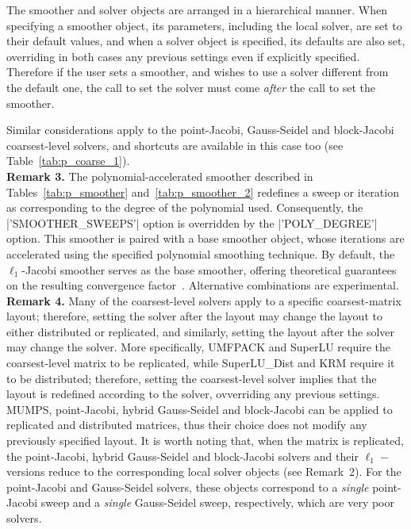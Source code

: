 The smoother and solver objects are arranged in a
hierarchical manner. When specifying a smoother object, its parameters,
including the local solver, are set to their default values, and when a solver
object is specified, its defaults are also set, overriding in both
cases any previous settings even if explicitly specified. Therefore if
the user sets a smoother, and wishes to use a solver
different from  the default one, the call to set the solver must come
\emph{after} the call to set the smoother.

Similar considerations apply to the point-Jacobi, Gauss-Seidel and block-Jacobi
coarsest-level solvers, and shortcuts are available
in this case too (see Table~\ref{tab:p_coarse_1}). \\

\textbf{Remark 3.} The polynomial-accelerated smoother described in Tables~\ref{tab:p_smoother}
and~\ref{tab:p_smoother_2} redefines a sweep or iteration as corresponding to the degree of 
the polynomial used. Consequently, the \fortinline|'SMOOTHER_SWEEPS'| option is overridden by 
the \fortinline|'POLY_DEGREE'| option. This smoother is paired with a base smoother 
object, whose iterations are accelerated using the specified polynomial smoothing technique. 
By default, the $\ell_1$-Jacobi smoother serves as the base smoother, offering theoretical 
guarantees on the resulting convergence
factor~\cite{DDFMT2024,LOTTES}. Alternative combinations are
experimental.\\

\textbf{Remark 4.} Many of the coarsest-level solvers apply to a
specific coarsest-matrix layout;  therefore, setting the solver after
the layout may change the layout to either distributed or replicated,
and similarly, setting the layout after the solver may change the
solver. More specifically, UMFPACK and SuperLU require the coarsest-level
matrix to be replicated, while SuperLU\_Dist and KRM require it to be
distributed; therefore, setting the coarsest-level solver implies
that the layout is redefined according to the solver, ovverriding any 
previous settings. MUMPS,  point-Jacobi,
hybrid Gauss-Seidel and block-Jacobi can be applied to
replicated and distributed matrices, thus their choice
does not modify any previously specified layout.
It is worth noting that, when the matrix is replicated,
the point-Jacobi, hybrid Gauss-Seidel and block-Jacobi solvers and 
their $\ell_1-$ versions reduce to the corresponding local solver
objects (see Remark~2). For the point-Jacobi and Gauss-Seidel solvers,
these objects correspond to a \emph{single} point-Jacobi sweep and a
\emph{single} Gauss-Seidel sweep, respectively, which are very poor
solvers. 

